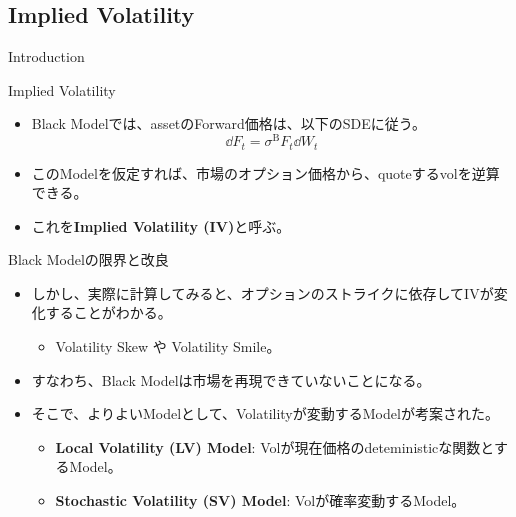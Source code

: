 \documentclass[dvipdfmx,9pt]{beamer}
\begin{document}
\subsection{Implied Volatility}
\begin{frame}{Introduction}
  \begin{block}{Implied Volatility}
    \begin{itemize}
      \item Black Modelでは、assetのForward価格は、以下のSDEに従う。
            \begin{equation}
              \dd F_{t} = \sigma^{\mathrm{B}} F_{t}\dd W_{t}
            \end{equation}
      \item このModelを仮定すれば、市場のオプション価格から、quoteするvolを逆算できる。
      \item これを\textbf{Implied Volatility (IV)}と呼ぶ。
    \end{itemize}
  \end{block}
  \begin{block}{Black Modelの限界と改良}
    \begin{itemize}
      \item しかし、実際に計算してみると、オプションのストライクに依存してIVが変化することがわかる。
            \begin{itemize}
              \item Volatility Skew や Volatility Smile。
            \end{itemize}
      \item すなわち、Black Modelは市場を再現できていないことになる。
      \item そこで、よりよいModelとして、Volatilityが変動するModelが考案された。
            \begin{itemize}
              \item \textbf{Local Volatility (LV) Model}: Volが現在価格のdeteministicな関数とするModel。
              \item \textbf{Stochastic Volatility (SV) Model}: Volが確率変動するModel。
            \end{itemize}
    \end{itemize}
  \end{block}
\end{frame}
\end{document}
